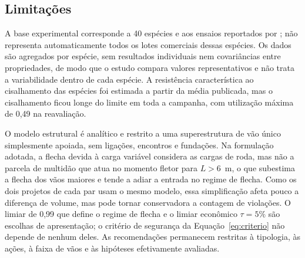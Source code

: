 \subsection{Limitações}\label{sec:limitacoes}

A base experimental corresponde a 40 espécies e aos ensaios reportados por \textcite{DiasLahr2004}; não representa automaticamente todos os lotes comerciais dessas espécies. Os dados são agregados por espécie, sem resultados individuais nem covariâncias entre propriedades, de modo que o estudo compara valores representativos e não trata a variabilidade dentro de cada espécie. A resistência característica ao cisalhamento das espécies foi estimada a partir da média publicada, mas o cisalhamento ficou longe do limite em toda a campanha, com utilização máxima de 0,49 na reavaliação.

O modelo estrutural é analítico e restrito a uma superestrutura de vão único simplesmente apoiada, sem ligações, encontros e fundações. Na formulação adotada, a flecha devida à carga variável considera as cargas de roda, mas não a parcela de multidão que atua no momento fletor para $L>6$~m, o que subestima a flecha dos vãos maiores e tende a adiar a entrada no regime de flecha. Como os dois projetos de cada par usam o mesmo modelo, essa simplificação afeta pouco a diferença de volume, mas pode tornar conservadora a contagem de violações. O limiar de 0,99 que define o regime de flecha e o limiar econômico $\tau=5\%$ são escolhas de apresentação; o critério de segurança da Equação~\eqref{eq:criterio} não depende de nenhum deles. As recomendações permanecem restritas à tipologia, às ações, à faixa de vãos e às hipóteses efetivamente avaliadas.
